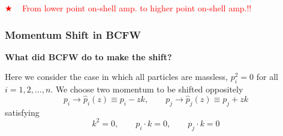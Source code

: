 \documentclass{beamer}
\begin{document}
\begin{frame}
\begin{tikzpicture}[x=0.75pt,y=0.75pt,yscale=-1,xscale=1]
\end{tikzpicture}

\vspace{1em}

\textcolor{red}{$\bigstar $ ~ From lower point on-shell amp. to higher point on-shell amp.!!}

\end{frame}

\begin{frame}
    \frametitle{Momentum Shift in BCFW}
    \textbf{What did BCFW do to make the shift?}

    Here we consider the case in which all particles are massless, $p_i^2 = 0$ for all $i = 1, 2, \dotsc, n$. We choose two momentum to be shifted oppositely 
    \begin{equation*}
        p_i\rightarrow\hat{p}_i(z)\equiv p_i-zk,\qquad p_j\rightarrow\hat{p}_j(z)\equiv p_j+zk
    \end{equation*}
    satisfying 
    \begin{equation*}
        k^2=0,\qquad p_i\cdot k=0,\qquad p_j\cdot k=0
    \end{equation*}

\begin{figure}
    \centering
    \begin{minipage}{0.45\textwidth}

\begin{tikzpicture}[scale=0.7,x=0.75pt,y=0.75pt,yscale=-1,xscale=1]


\end{tikzpicture}
\end{minipage}
\end{figure}
\end{frame}
\end{document}
